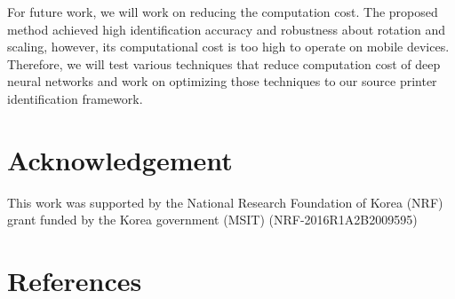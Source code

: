 \documentclass[5p, times]{elsarticle}
\begin{document}
For future work, we will work on reducing the computation cost. The proposed method achieved high identification accuracy and robustness about rotation and scaling, however, its computational cost is too high to operate on mobile devices. Therefore, we will test various techniques that reduce computation cost of deep neural networks and work on optimizing those techniques to our source printer identification framework.

\section*{Acknowledgement}
This work was supported by the National Research Foundation of Korea (NRF) grant funded by the Korea government (MSIT) (NRF-2016R1A2B2009595)

\section*{References}
\end{document}
